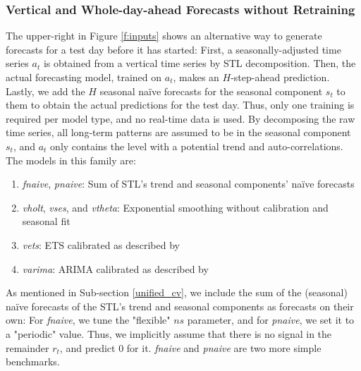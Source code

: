 \subsubsection{Vertical and Whole-day-ahead Forecasts without Retraining}
\label{vert}

The upper-right in Figure \ref{f:inputs} shows an alternative way to
    generate forecasts for a test day before it has started:
First, a seasonally-adjusted time series $a_t$ is obtained from a vertical
    time series by STL decomposition.
Then, the actual forecasting model, trained on $a_t$, makes an $H$-step-ahead
    prediction.
Lastly, we add the $H$ seasonal na\"{i}ve forecasts for the seasonal component
    $s_t$ to them to obtain the actual predictions for the test day.
Thus, only one training is required per model type, and no real-time data is
    used.
By decomposing the raw time series, all long-term patterns are assumed to be
    in the seasonal component $s_t$, and $a_t$ only contains the level with
    a potential trend and auto-correlations.
The models in this family are:
\begin{enumerate}
\item \textit{fnaive},
      \textit{pnaive}:
          Sum of STL's trend and seasonal components' na\"{i}ve forecasts
\item \textit{vholt},
      \textit{vses}, and
      \textit{vtheta}:
          Exponential smoothing without calibration and seasonal
                       fit
\item \textit{vets}:
          ETS calibrated as described by \cite{hyndman2008b}
\item \textit{varima}:
          ARIMA calibrated as described by \cite{hyndman2008a}
\end{enumerate}
As mentioned in Sub-section \ref{unified_cv}, we include the sum of the
    (seasonal) na\"{i}ve forecasts of the STL's trend and seasonal components
    as forecasts on their own:
For \textit{fnaive}, we tune the "flexible" $ns$ parameter, and for
    \textit{pnaive}, we set it to a "periodic" value.
Thus, we implicitly assume that there is no signal in the remainder $r_t$, and
    predict $0$ for it.
\textit{fnaive} and \textit{pnaive} are two more simple benchmarks.
